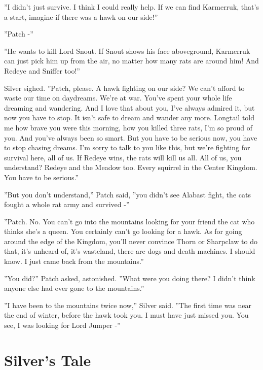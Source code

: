 \documentclass[12pt]{book}
\begin{document}
 ''I didn't just survive. I think I could really help. If we can find Karmerruk, that's a start, imagine if there was a hawk on our side!''\par
 ''Patch -''\par
 ''He wants to kill Lord Snout. If Snout shows his face aboveground, Karmerruk can just pick him up from the air, no matter how many rats are around him! And Redeye and Sniffer too!''\par
 Silver sighed. ''Patch, please. A hawk fighting on our side? We can't afford to waste our time on daydreams. We're at war. You've spent your whole life dreaming and wandering. And I love that about you, I've always admired it, but now you have to stop. It isn't safe to dream and wander any more. Longtail told me how brave you were this morning, how you killed three rats, I'm so proud of you. And you've always been so smart. But you have to be serious now, you have to stop chasing dreams. I'm sorry to talk to you like this, but we're fighting for survival here, all of us. If Redeye wins, the rats will kill us all. All of us, you understand? Redeye and the Meadow too. Every squirrel in the Center Kingdom. You have to be serious.''\par
 ''But you don't understand,'' Patch said, ''you didn't see Alabast fight, the cats fought a whole rat army and survived -''\par
 ''Patch. No. You can't go into the mountains looking for your friend the cat who thinks she's a queen. You certainly can't go looking for a hawk. As for going around the edge of the Kingdom, you'll never convince Thorn or Sharpclaw to do that, it's unheard of, it's wasteland, there are dogs and death machines. I should know. I just came back from the mountains.''\par
 ''You did?'' Patch asked, astonished. ''What were you doing there? I didn't think anyone else had ever gone to the mountains.''\par
 ''I have been to the mountains twice now,'' Silver said. ''The first time was near the end of winter, before the hawk took you. I must have just missed you. You see, I was looking for Lord Jumper -''\par

\section{Silver's Tale}
\end{document}
